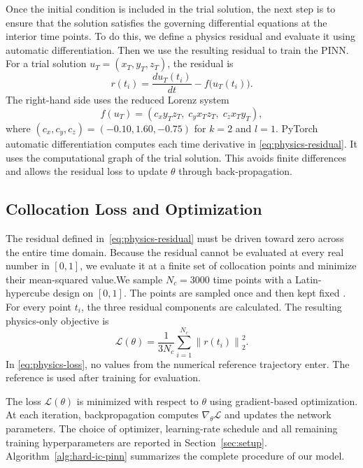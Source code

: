 Once the initial condition is included in the trial solution, the next step is to ensure that the solution satisfies the governing differential equations at the interior time points. To do this, we define a physics residual and evaluate it using automatic differentiation. Then we use the resulting residual to train the PINN. For a trial solution
$u_T=(x_T,y_T,z_T)$, the residual is
\begin{equation}
    r(t_i)=\frac{d u_T(t_i)}{d t}-f\bigl(u_T(t_i)\bigr).
    \label{eq:physics-residual}
\end{equation}
The right-hand side uses the reduced Lorenz system
\begin{equation}
    f(u_T)=
    \left(c_x y_Tz_T,\;c_y x_Tz_T,\;c_z x_Ty_T\right),
    \label{eq:lorenz-rhs}
\end{equation}
where $(c_x,c_y,c_z)=(-0.10,1.60,-0.75)$ for $k=2$ and $l=1$. PyTorch
automatic differentiation computes each time derivative in \eqref{eq:physics-residual}.
It uses the computational graph of the trial solution. This avoids finite
differences and allows the residual loss to update $\theta$ through
back-propagation.

\subsection{Collocation Loss and Optimization}

The residual defined in~\eqref{eq:physics-residual} must be driven
toward zero across the entire time domain. Because the residual
cannot be evaluated at every real number in $[0,1]$, we evaluate it
at a finite set of collocation points and minimize their
mean-squared value.We sample $N_c=3000$ time points with a Latin-hypercube design on $[0,1]$.
The points are sampled once and then kept fixed . For every point $t_i$, the
three residual components are calculated. The resulting physics-only objective is
\begin{equation}
    \mathcal{L}(\theta)=
    \frac{1}{3N_c}\sum_{i=1}^{N_c}\left\|r(t_i)\right\|_2^2.
    \label{eq:physics-loss}
\end{equation}
In \eqref{eq:physics-loss}, no values from the numerical reference trajectory enter.
The reference is used after training for evaluation.

The loss $\mathcal{L}(\theta)$ is minimized with respect to $\theta$ using gradient-based optimization. At each iteration, backpropagation computes $\nabla_\theta \mathcal{L}$ and updates the network parameters. The choice of optimizer, learning-rate schedule  and all remaining training hyperparameters are reported in Section~\ref{sec:setup}. Algorithm~\ref{alg:hard-ic-pinn} summarizes the complete procedure of our model.





